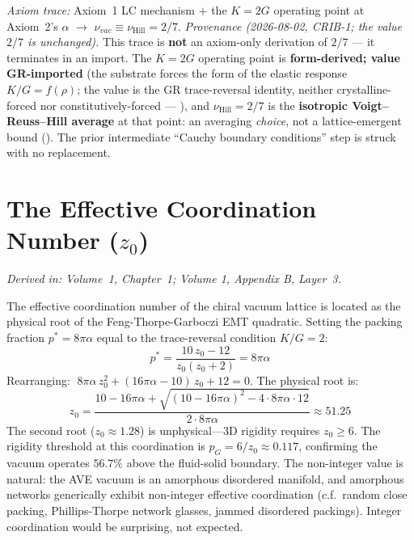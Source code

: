 \textit{Axiom trace:} Axiom~1 LC mechanism $+$ the $K = 2G$ operating point at Axiom~2's $\alpha$ $\rightarrow$ $\nu_{vac} \equiv \nu_{\text{Hill}} = 2/7$. \emph{Provenance (2026-08-02, CRIB-1; the value $2/7$ is unchanged).} This trace is \textbf{not} an axiom-only derivation of $2/7$ --- it terminates in an import. The $K = 2G$ operating point is \textbf{form-derived; value GR-imported} (the substrate forces the form of the elastic response $K/G = f(\rho)$; the value is the GR trace-reversal identity, neither crystalline-forced nor constitutively-forced --- ), and $\nu_{\text{Hill}} = 2/7$ is the \textbf{isotropic Voigt--Reuss--Hill average} at that point: an averaging \emph{choice}, not a lattice-emergent bound (). The prior intermediate ``Cauchy boundary conditions'' step is struck with no replacement.

\section{The Effective Coordination Number ($z_0$)}
\label{app:z0_coordination}
\textit{Derived in: Volume~1, Chapter~1; Volume 1, Appendix B, Layer~3.}

The effective coordination number of the chiral vacuum lattice is located as the physical root of the Feng-Thorpe-Garboczi EMT quadratic. Setting the packing fraction $p^* = 8\pi\alpha$ equal to the trace-reversal condition $K/G = 2$:
\begin{equation}
    p^* = \frac{10\,z_0 - 12}{z_0(z_0 + 2)} = 8\pi\alpha
\end{equation}
Rearranging: $\;8\pi\alpha\, z_0^2 + (16\pi\alpha - 10)\,z_0 + 12 = 0$. The physical root is:
\begin{equation}
    z_0 = \frac{10 - 16\pi\alpha + \sqrt{(10-16\pi\alpha)^2 - 4 \cdot 8\pi\alpha \cdot 12}}{2 \cdot 8\pi\alpha}
    \approx \boxed{51.25}
\end{equation}
The second root ($z_0 \approx 1.28$) is unphysical---3D rigidity requires $z_0 \geq 6$. The rigidity threshold at this coordination is $p_G = 6/z_0 \approx 0.117$, confirming the vacuum operates $56.7\%$ above the fluid-solid boundary. The non-integer value is natural: the AVE vacuum is an amorphous disordered manifold, and amorphous networks generically exhibit non-integer effective coordination (c.f.~random close packing, Phillips-Thorpe network glasses, jammed disordered packings). Integer coordination would be surprising, not expected.

